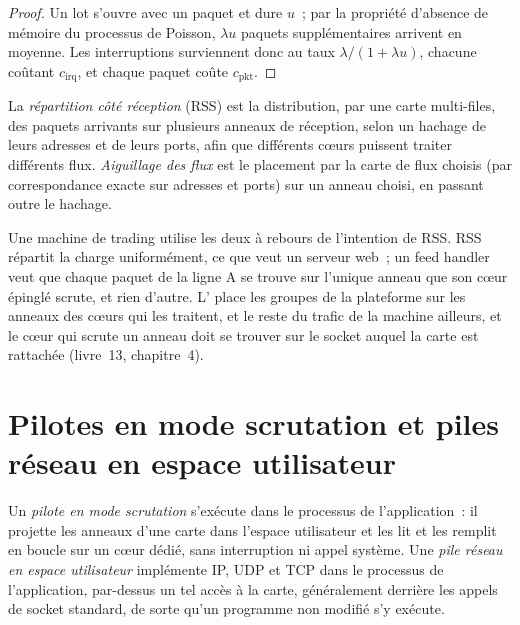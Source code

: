 \begin{proof}
Un lot s'ouvre avec un paquet et dure $u$~; par la propriété d'absence de mémoire du processus de Poisson, $\lambda u$ paquets supplémentaires arrivent
en moyenne. Les interruptions surviennent donc au taux $\lambda/(1+\lambda u)$, chacune coûtant $c_{\mathrm{irq}}$, et chaque paquet coûte
$c_{\mathrm{pkt}}$.
\end{proof}

\begin{definition}\label{def:nw:network-cards-and-kernel-bypass:rss}
La \emph{répartition côté réception} (RSS) est la distribution, par une carte multi-files, des paquets arrivants sur plusieurs
anneaux de réception, selon un hachage de leurs adresses et de leurs ports, afin que différents cœurs puissent traiter différents flux. \emph{Aiguillage
des flux} est le placement par la carte de flux choisis (par correspondance exacte sur adresses et ports) sur un anneau choisi,
en passant outre le hachage.
\end{definition}

Une machine de trading utilise les deux à rebours de l'intention de RSS. RSS répartit la charge uniformément, ce que veut un serveur web~; un feed handler veut que
chaque paquet de la ligne A se trouve sur l'unique anneau que son cœur épinglé scrute, et rien d'autre. L' place les groupes de la plateforme sur les anneaux
des cœurs qui les traitent, et le reste du trafic de la machine ailleurs, et le cœur qui scrute un anneau doit se trouver sur le socket
auquel la carte est rattachée (livre~13, chapitre~4).

\section{Pilotes en mode scrutation et piles réseau en espace utilisateur}

\begin{definition}\label{def:nw:network-cards-and-kernel-bypass:pmd}
Un \emph{pilote en mode scrutation} s'exécute dans le processus de l'application~: il projette les anneaux d'une carte dans l'espace utilisateur et
les lit et les remplit en boucle sur un cœur dédié, sans interruption ni appel système. Une \emph{pile réseau en espace
utilisateur} implémente IP, UDP et TCP dans le processus de l'application, par-dessus un tel accès à la carte,
généralement derrière les appels de socket standard, de sorte qu'un programme non modifié s'y exécute.
\end{definition}

